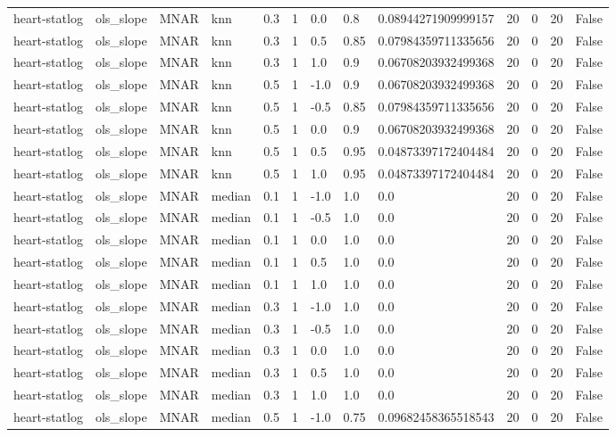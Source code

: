 \begin{tabular}{lllllllllllll}
heart-statlog & ols\_slope & MNAR & knn & 0.3 & 1 & 0.0 & 0.8 & 0.08944271909999157 & 20 & 0 & 20 & False \\
heart-statlog & ols\_slope & MNAR & knn & 0.3 & 1 & 0.5 & 0.85 & 0.07984359711335656 & 20 & 0 & 20 & False \\
heart-statlog & ols\_slope & MNAR & knn & 0.3 & 1 & 1.0 & 0.9 & 0.06708203932499368 & 20 & 0 & 20 & False \\
heart-statlog & ols\_slope & MNAR & knn & 0.5 & 1 & -1.0 & 0.9 & 0.06708203932499368 & 20 & 0 & 20 & False \\
heart-statlog & ols\_slope & MNAR & knn & 0.5 & 1 & -0.5 & 0.85 & 0.07984359711335656 & 20 & 0 & 20 & False \\
heart-statlog & ols\_slope & MNAR & knn & 0.5 & 1 & 0.0 & 0.9 & 0.06708203932499368 & 20 & 0 & 20 & False \\
heart-statlog & ols\_slope & MNAR & knn & 0.5 & 1 & 0.5 & 0.95 & 0.04873397172404484 & 20 & 0 & 20 & False \\
heart-statlog & ols\_slope & MNAR & knn & 0.5 & 1 & 1.0 & 0.95 & 0.04873397172404484 & 20 & 0 & 20 & False \\
heart-statlog & ols\_slope & MNAR & median & 0.1 & 1 & -1.0 & 1.0 & 0.0 & 20 & 0 & 20 & False \\
heart-statlog & ols\_slope & MNAR & median & 0.1 & 1 & -0.5 & 1.0 & 0.0 & 20 & 0 & 20 & False \\
heart-statlog & ols\_slope & MNAR & median & 0.1 & 1 & 0.0 & 1.0 & 0.0 & 20 & 0 & 20 & False \\
heart-statlog & ols\_slope & MNAR & median & 0.1 & 1 & 0.5 & 1.0 & 0.0 & 20 & 0 & 20 & False \\
heart-statlog & ols\_slope & MNAR & median & 0.1 & 1 & 1.0 & 1.0 & 0.0 & 20 & 0 & 20 & False \\
heart-statlog & ols\_slope & MNAR & median & 0.3 & 1 & -1.0 & 1.0 & 0.0 & 20 & 0 & 20 & False \\
heart-statlog & ols\_slope & MNAR & median & 0.3 & 1 & -0.5 & 1.0 & 0.0 & 20 & 0 & 20 & False \\
heart-statlog & ols\_slope & MNAR & median & 0.3 & 1 & 0.0 & 1.0 & 0.0 & 20 & 0 & 20 & False \\
heart-statlog & ols\_slope & MNAR & median & 0.3 & 1 & 0.5 & 1.0 & 0.0 & 20 & 0 & 20 & False \\
heart-statlog & ols\_slope & MNAR & median & 0.3 & 1 & 1.0 & 1.0 & 0.0 & 20 & 0 & 20 & False \\
heart-statlog & ols\_slope & MNAR & median & 0.5 & 1 & -1.0 & 0.75 & 0.09682458365518543 & 20 & 0 & 20 & False \\

\end{tabular}
